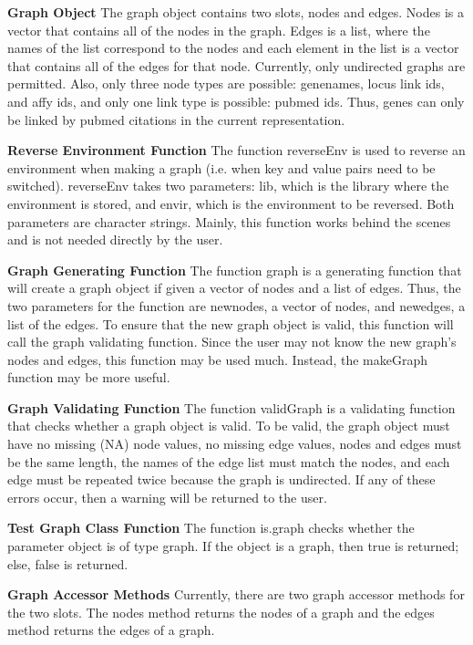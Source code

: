 \documentclass{article}[12pt]
\begin{document}
\noindent
{\bf Graph Object}
\noindent
The graph object contains two slots, nodes and edges.  Nodes is a 
vector that contains all of the nodes in the graph.  Edges is a list, 
where the names of the list correspond to the nodes and each element 
in the list is a vector that contains all of the edges for that node.
Currently, only undirected graphs are permitted.  Also,
only three node types are possible: genenames, locus link ids, and 
affy ids, and only one link type is possible: pubmed ids.  Thus,
genes can only be linked by pubmed citations in the current
representation.


\noindent
{\bf Reverse Environment Function}
\noindent
The function reverseEnv is used to reverse an environment when making a 
graph (i.e. when key and value pairs need to be switched).
reverseEnv takes two parameters: lib, which is the library where the
environment is stored, and envir, which is the environment to be reversed.
Both parameters are character strings.  Mainly, this function works behind
the scenes and is not needed directly by the user.


\noindent
{\bf Graph Generating Function}
\noindent
The function graph is a generating function that will create a graph
object if given a vector of nodes and a list of edges.  Thus, the two
parameters for the function are newnodes, a vector of nodes, and newedges,
a list of the edges.  To ensure that the new graph object is valid, this 
function will call the graph validating function.  Since the user may not 
know the new graph's nodes and edges, this function may be used much.  
Instead, the makeGraph function may be more useful.


\noindent
{\bf Graph Validating Function}
\noindent
The function validGraph is a validating function that checks whether
a graph object is valid.  To be valid, the graph object must have no
missing (NA) node values, no missing edge values, nodes and edges must 
be the same length, the names of the edge list must match the nodes, 
and each edge must be repeated twice because the graph is undirected.  
If any of these errors occur, then a warning will be returned to the user.


\noindent
{\bf Test Graph Class Function}
\noindent
The function is.graph checks whether the parameter object is of type
graph.  If the object is a graph, then true is returned; else, false is
returned.


\noindent
{\bf Graph Accessor Methods}
\noindent
Currently, there are two graph accessor methods for the two slots.
The nodes method returns the nodes of a graph and the edges method
returns the edges of a graph.
\end{document}
